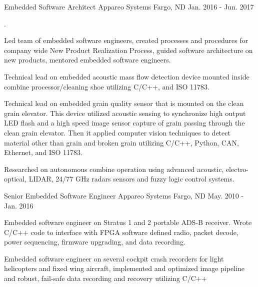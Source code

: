 \begin{cventries}
  \cventry
    {Embedded Software Architect} %
    {Appareo Systems} %
    {Fargo, ND} %
    {Jan. 2016 - Jun. 2017} %
    {.
      \begin{cvitems} %
        \item {Led team of embedded software engineers, created processes and procedures for company wide New Product Realization Process, guided software architecture on new products, mentored embedded software engineers.}
        \item {Technical lead on embedded acoustic mass flow detection device mounted inside combine processor/cleaning shoe utilizing C/C++, and ISO 11783.}
        \item {Technical lead on embedded grain quality sensor that is mounted on the clean grain elevator. This device utilized acoustic sensing to synchronize high output LED flash and a high speed image sensor capture of grain passing through the clean grain elevator. Then it applied computer vision techniques to detect material other than grain and broken grain utilizing C/C++, Python, CAN, Ethernet, and ISO 11783.}
        \item {Researched on autonomous combine operation using advanced acoustic, electro-optical, LIDAR, 24/77 GHz radars sensors and fuzzy logic control systems.}
      \end{cvitems}
    }

  \cventry
    {Senior Embedded Software Engineer} %
    {Appareo Systems} %
    {Fargo, ND} %
    {May. 2010 - Jan. 2016} %
    {
      \begin{cvitems} %
        \item {Embedded software engineer on Stratus 1 and 2 portable ADS-B receiver. Wrote C/C++ code to interface with FPGA software defined radio, packet decode, power sequencing, firmware upgrading, and data recording.}
        \item {Embedded software engineer on several cockpit crash recorders for light helicopters and fixed wing aircraft, implemented and optimized image pipeline and robust, fail-safe data recording and recovery utilizing C/C++}
      \end{cvitems}
    }


\end{cventries}
